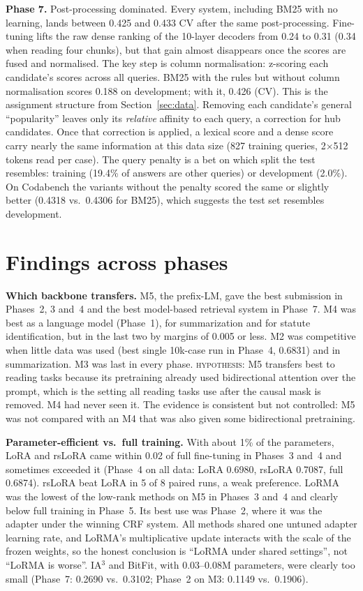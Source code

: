 \documentclass[11pt, oneside]{article}
\newcommand{\hyp}{\textsc{hypothesis}}
\begin{document}
\textbf{Phase 7.} Post-processing dominated. Every system, including BM25 with no learning, lands between 0.425 and
0.433 CV after the same post-processing. Fine-tuning lifts the raw dense ranking of the 10-layer decoders from 0.24 to
0.31 (0.34 when reading four chunks), but that gain almost disappears once the scores are fused and normalised. The key
step is column normalisation: z-scoring each candidate's scores across all queries. BM25 with the rules but without
column normalisation scores 0.188 on development; with it, 0.426 (CV).
This is the assignment structure from Section~\ref{sec:data}. Removing each candidate's general ``popularity'' leaves
only its \emph{relative} affinity to each query, a correction for hub candidates. Once that correction is applied, a
lexical score and a dense score carry nearly the same information at this data size (827 training queries, 2$\times$512
tokens read per case). The query penalty is a bet on which split the test resembles: training (19.4\% of answers are
other queries) or development (2.0\%). On Codabench the variants without the penalty scored the same or slightly
better (0.4318 vs.\ 0.4306 for BM25), which suggests the test set resembles development.

\section{Findings across phases}\label{sec:cross}
\textbf{Which backbone transfers.} M5, the prefix-LM, gave the best submission in Phases~2, 3 and~4 and the best
model-based retrieval system in Phase~7. M4 was best as a language model (Phase~1), for summarization and for statute
identification, but in the last two by margins of 0.005 or less.
M2 was competitive when little data was used (best single 10k-case run in Phase~4, 0.6831) and in summarization. M3
was last in every phase. \hyp: M5 transfers best to reading tasks because its pretraining already used bidirectional
attention over the prompt, which is the setting all reading tasks use after the causal mask is removed. M4 had never
seen it. The evidence is consistent but not controlled: M5 was not compared with an M4 that was also given some
bidirectional pretraining.

\textbf{Parameter-efficient vs.\ full training.} With about 1\% of the parameters, LoRA and rsLoRA came within 0.02 of
full fine-tuning in Phases~3 and~4 and sometimes exceeded it (Phase~4 on all data: LoRA 0.6980, rsLoRA 0.7087, full
0.6874). rsLoRA beat LoRA in 5 of 8 paired runs, a weak preference. LoRMA was the lowest of the low-rank methods on M5
in Phases~3 and~4 and clearly below full training in Phase~5. Its best use was Phase~2, where it was the adapter
under the winning CRF system. All methods shared one untuned adapter learning rate, and LoRMA's multiplicative update
interacts with the scale of the frozen weights, so the honest conclusion is ``LoRMA under shared settings'', not
``LoRMA is worse''. IA$^3$ and BitFit, with 0.03--0.08M parameters, were clearly too small (Phase~7: 0.2690 vs.\
0.3102; Phase~2 on M3: 0.1149 vs.\ 0.1906).
\end{document}
